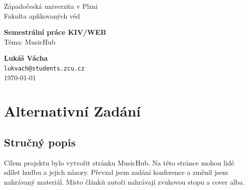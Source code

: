 \documentclass[12pt, a4paper]{article}
\begin{document}
\begin{titlepage}
    \centering 

    
    {\Large Západočeská univerzita v Plzni \\}
    {\Large Fakulta aplikovaných věd \\}
    \vspace{2cm}
    
    {\Huge \textbf{Semestrální práce KIV/WEB} \\}
    \vspace{0.5cm}
    {\Large Téma: MusicHub \\}

    \vfill 


    {\Large \textbf{Lukáš Vácha} \\}
    \vspace{0.5cm} 
    {\large \texttt{lukvach@students.zcu.cz} \\}
    \vspace{1cm}
    {\Large \today} 

\end{titlepage}


\tableofcontents
\newpage
\section{Alternativní Zadání}
\subsection{Stručný popis}
Cílem projektu bylo vytvořit stránku MusicHub. 
Na této stránce mohou lidé sdílet hudbu a jejich názory.
Převzal jsem zadání konference a změnil jsem nahrávaný materiál. 
Místo článků autoři nahrávají zvukovou stopu a cover alba.
\end{document}
